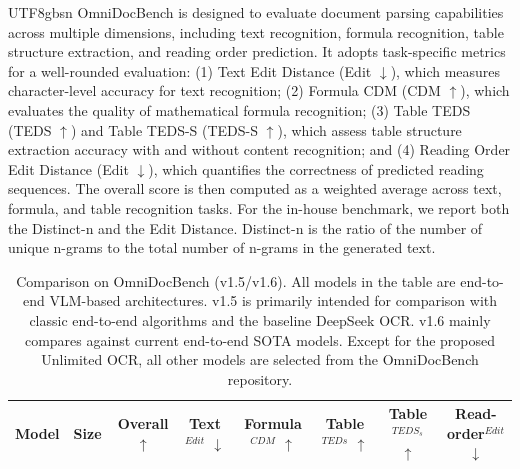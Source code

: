 \documentclass[11pt, a4paper, logo, copyright, nonumbering]{deepseek}
\begin{document}
\begin{CJK*}{UTF8}{gbsn}
OmniDocBench is designed to evaluate document parsing capabilities across multiple dimensions, including text recognition, formula recognition, table structure extraction, and reading order prediction. It adopts task-specific metrics for a well-rounded evaluation: (1) Text Edit Distance (Edit $\downarrow$), which measures character-level accuracy for text recognition; (2) Formula CDM (CDM $\uparrow$), which evaluates the quality of mathematical formula recognition; (3) Table TEDS (TEDS $\uparrow$) and Table TEDS-S (TEDS-S $\uparrow$), which assess table structure extraction accuracy with and without content recognition; and (4) Reading Order Edit Distance (Edit $\downarrow$), which quantifies the correctness of predicted reading sequences. The overall score is then computed as a weighted average across text, formula, and table recognition tasks. For the in-house benchmark, we report both the Distinct-n and the Edit Distance. Distinct-n is the ratio of the number of unique n-grams to the total number of n-grams in the generated text.




\begin{table}[h]
\footnotesize
\caption{Comparison on OmniDocBench (v1.5/v1.6). All models in the table are end-to-end VLM-based architectures. v1.5 is primarily intended for comparison with classic end-to-end algorithms and the baseline DeepSeek OCR. v1.6 mainly compares against current end-to-end SOTA models. Except for the proposed Unlimited OCR, all other models are selected from the OmniDocBench repository.}
\label{tab:omnidocbench}
\centering
\setlength{\tabcolsep}{1.6pt}
{
\begin{tabular}{l|c|c|ccccc}
\toprule[.9pt]
{\textbf{Model}} &Size & Overall $\uparrow$ & Text$^{Edit}$ $\downarrow$  &  Formula$^{CDM}$ $\uparrow$ & Table$^{TEDs}$ $\uparrow$ & Table$^{TEDS_s}$ $\uparrow$ & Read-order$^{Edit}$ $\downarrow$  \\  
\midrule  


\end{tabular}}
\end{table}
\end{CJK*}
\end{document}

